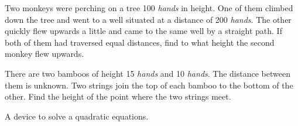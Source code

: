 \documentclass[]{article}
\begin{document}
{\begin{quote}  {
}  \end{quote}

{Two monkeys were perching on a tree 100 \textit{hands} in height. One of them
climbed down the tree and went to a well situated at a distance of 200
\textit{hands}. The other quickly flew upwards a little and came to the same well
by a straight path. If both of them had traversed equal distances, find
to what height the second monkey flew upwards.}

\begin{quote}  {
}  \end{quote}

{There are two bamboos of height 15 \textit{hands} and 10 \textit{hands}. The distance
between them is unknown. Two strings join the top of each bamboo to the
bottom of the other. Find the height of the point}
\newpage
\large
\noindent where the two strings meet.
 
\vspace{20pt}
\begin{center}
\begin{Large}
 \label{madh}
{}
\end{Large}
\end{center}
\vspace{10pt}

{A device to solve a quadratic equations. }

\begin{quote}  {}
\end{quote}}
\end{document}
